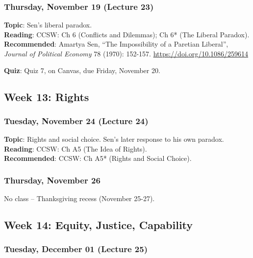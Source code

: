 \documentclass[
  letterpaper,
  DIV=11,
  numbers=noendperiod]{scrartcl}
\begin{document}
\subsubsection{Thursday, November 19 (Lecture
23)}\label{thursday-november-19-lecture-23}

\textbf{Topic}: Sen's liberal paradox.\\
\textbf{Reading}: CCSW: Ch 6 (Conflicts and Dilemmas); Ch 6* (The
Liberal Paradox).\\
\textbf{Recommended}: Amartya Sen, ``The Impossibility of a Paretian
Liberal'', \emph{Journal of Political Economy} 78 (1970): 152-157.
\url{https://doi.org/10.1086/259614}

\textbf{Quiz}: Quiz 7, on Canvas, due Friday, November 20.

\subsection{Week 13: Rights}\label{week-13-rights}

\subsubsection{Tuesday, November 24 (Lecture
24)}\label{tuesday-november-24-lecture-24}

\textbf{Topic}: Rights and social choice. Sen's later response to his
own paradox.\\
\textbf{Reading}: CCSW: Ch A5 (The Idea of Rights).\\
\textbf{Recommended}: CCSW: Ch A5* (Rights and Social Choice).

\subsubsection{Thursday, November 26}\label{thursday-november-26}

No class -- Thanksgiving recess (November 25-27).

\subsection{Week 14: Equity, Justice,
Capability}\label{week-14-equity-justice-capability}

\subsubsection{Tuesday, December 01 (Lecture
25)}\label{tuesday-december-01-lecture-25}
\end{document}
